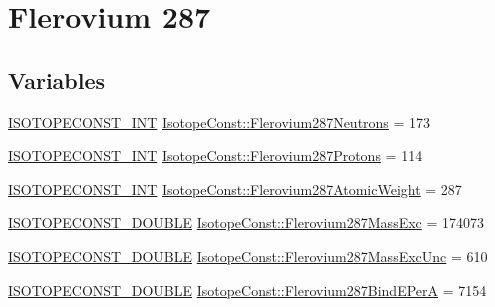 \hypertarget{group___isotope_const-_flerovium-_fl287}{}\section{Flerovium 287}
\label{group___isotope_const-_flerovium-_fl287}
\subsection*{Variables}
\begin{DoxyCompactItemize}
\item 
\mbox{\hyperlink{group___isotope_const-_macros_ga5f18360b3e99483a35c32d789e62621c}{I\+S\+O\+T\+O\+P\+E\+C\+O\+N\+S\+T\+\_\+\+I\+NT}} \mbox{\hyperlink{group___isotope_const-_flerovium-_fl287_ga8f8944156da6602fa808a1288e43bc8f}{Isotope\+Const\+::\+Flerovium287\+Neutrons}} = 173
\item 
\mbox{\hyperlink{group___isotope_const-_macros_ga5f18360b3e99483a35c32d789e62621c}{I\+S\+O\+T\+O\+P\+E\+C\+O\+N\+S\+T\+\_\+\+I\+NT}} \mbox{\hyperlink{group___isotope_const-_flerovium-_fl287_gae36348348b574f3bb24161b72c31eb41}{Isotope\+Const\+::\+Flerovium287\+Protons}} = 114
\item 
\mbox{\hyperlink{group___isotope_const-_macros_ga5f18360b3e99483a35c32d789e62621c}{I\+S\+O\+T\+O\+P\+E\+C\+O\+N\+S\+T\+\_\+\+I\+NT}} \mbox{\hyperlink{group___isotope_const-_flerovium-_fl287_gaaa633d78a97821c902f90149c1bca967}{Isotope\+Const\+::\+Flerovium287\+Atomic\+Weight}} = 287
\item 
\mbox{\hyperlink{group___isotope_const-_macros_ga8f45a7272ce02c0b4c65c44636ed719a}{I\+S\+O\+T\+O\+P\+E\+C\+O\+N\+S\+T\+\_\+\+D\+O\+U\+B\+LE}} \mbox{\hyperlink{group___isotope_const-_flerovium-_fl287_gaf94ed03d584a6440465d7da599bc56e4}{Isotope\+Const\+::\+Flerovium287\+Mass\+Exc}} = 174073
\item 
\mbox{\hyperlink{group___isotope_const-_macros_ga8f45a7272ce02c0b4c65c44636ed719a}{I\+S\+O\+T\+O\+P\+E\+C\+O\+N\+S\+T\+\_\+\+D\+O\+U\+B\+LE}} \mbox{\hyperlink{group___isotope_const-_flerovium-_fl287_gae53c22d9039bc4fa3cefa95936a057d1}{Isotope\+Const\+::\+Flerovium287\+Mass\+Exc\+Unc}} = 610
\item 
\mbox{\hyperlink{group___isotope_const-_macros_ga8f45a7272ce02c0b4c65c44636ed719a}{I\+S\+O\+T\+O\+P\+E\+C\+O\+N\+S\+T\+\_\+\+D\+O\+U\+B\+LE}} \mbox{\hyperlink{group___isotope_const-_flerovium-_fl287_ga0780917e9d41ee4a9a3b6b6103810810}{Isotope\+Const\+::\+Flerovium287\+Bind\+E\+PerA}} = 7154
\item 

\end{DoxyCompactItemize}
